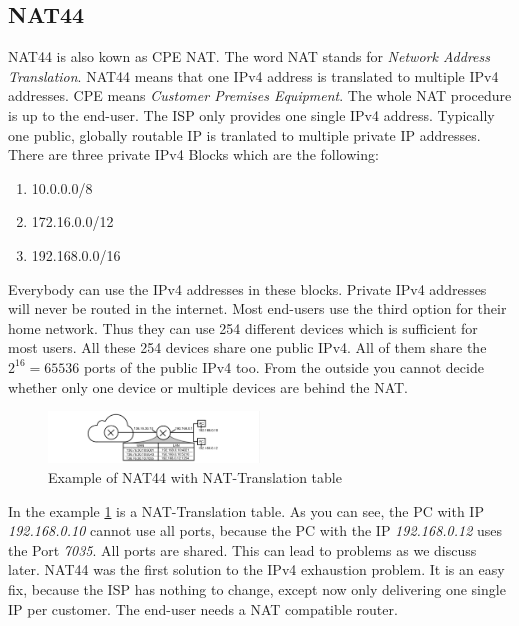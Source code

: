 \documentclass[format=sigconf, natbib=true, nonacm=true]{acmart}
\begin{document}
    \subsection{NAT44}
    NAT44 is also kown as CPE NAT. The word NAT stands for \textit{Network Address Translation}. NAT44 means that one IPv4 address is translated to multiple IPv4 addresses. CPE means \textit{Customer Premises Equipment}. The whole NAT procedure is up to the end-user. The ISP only provides one single IPv4 address. Typically one public, globally routable IP is tranlated to multiple private IP addresses. There are three private IPv4 Blocks which are the following:
    \begin{enumerate}
        \item 10.0.0.0/8
        \item 172.16.0.0/12
        \item 192.168.0.0/16
    \end{enumerate}
    Everybody can use the IPv4 addresses in these blocks. Private IPv4 addresses will never be routed in the internet. Most end-users use the third option for their home network. Thus they can use 254 different devices which is sufficient for most users. All these 254 devices share one public IPv4. All of them share the $2^{16} = 65536$ ports of the public IPv4 too. From the outside you cannot decide whether only one device or multiple devices are behind the NAT.
    \begin{figure}
        \centering
        \includegraphics[width=0.5\textwidth]{images/nat_44.png}
        \caption{Example of NAT44 with NAT-Translation table}
        \label{fig:nat_44}
    \end{figure}
    In the example \ref{fig:nat_44} is a NAT-Translation table. As you can see, the PC with IP \textit{192.168.0.10} cannot use all ports, because the PC with the IP \textit{192.168.0.12} uses the Port \textit{7035}. All ports are shared. This can lead to problems as we discuss later. NAT44 was the first solution to the IPv4 exhaustion problem. It is an easy fix, because the ISP has nothing to change, except now only delivering one single IP per customer. The end-user needs a NAT compatible router.
\end{document}
